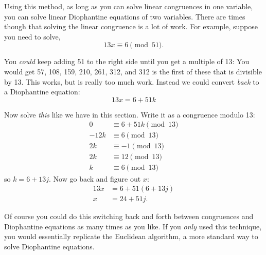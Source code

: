 \documentclass[10pt,]{book}
\theoremstyle{plain}
\theoremstyle{definition}
\theoremstyle{definition}
\theoremstyle{definition}
\numberwithin{equation}{chapter}
\newcommand{\amp}{ & }
\begin{document}
Using this method, as long as you can solve linear congruences in one variable, you can solve linear Diophantine equations of two variables. There are times though that solving the linear congruence is a lot of work. For example, suppose you need to solve,
\begin{equation*}
  13x \equiv 6 \pmod{51}.
\end{equation*}
%
\par

You \emph{could} keep adding 51 to the right side until you get a multiple of 13: You would get 57, 108, 159, 210, 261, 312, and 312 is the first of these that is divisible by 13. This works, but is really too much work. Instead we could convert \emph{back} to a Diophantine equation:
\begin{equation*}
  13x = 6 + 51k
\end{equation*}
%
\par

Now solve \emph{this} like we have in this section. Write it as a congruence modulo 13:
\begin{equation*}
  \begin{aligned}0 \amp \equiv 6 + 51k \pmod{13}\\
-12k \amp \equiv 6 \pmod{13}\\
2k \amp \equiv -1 \pmod{13}\\
2k \amp \equiv 12 \pmod{13}\\
k \amp \equiv 6 \pmod{13}
\end{aligned}
\end{equation*}
so \(k = 6 + 13j\). Now go back and figure out \(x\):
\begin{equation*}
  \begin{aligned}13x \amp  = 6 + 51(6+13j)\\
x \amp  = 24 + 51j.
\end{aligned}
\end{equation*}
%
\par

Of course you could do this switching back and forth between congruences and Diophantine equations as many times as you like. If you \emph{only} used this technique, you would essentially replicate the Euclidean algorithm, a more standard way to solve Diophantine equations.
%
\typeout{************************************************}
\typeout{************************************************}
\end{document}

